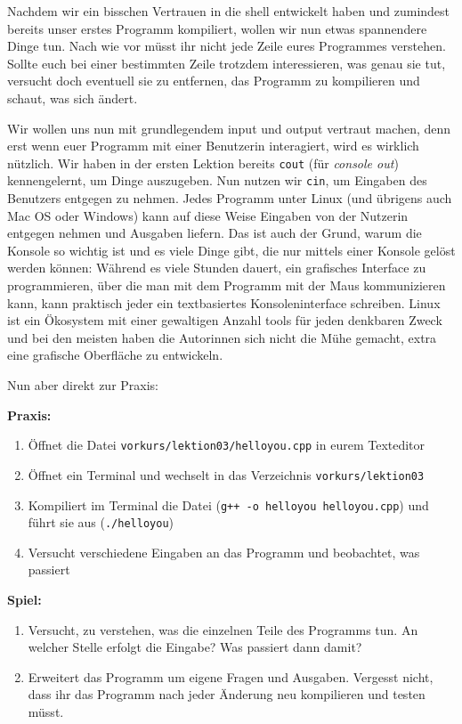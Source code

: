 
Nachdem wir ein bisschen Vertrauen in die shell entwickelt haben und zumindest
bereits unser erstes Programm kompiliert, wollen wir nun etwas spannendere
Dinge tun. Nach wie vor müsst ihr nicht jede Zeile eures Programmes verstehen.
Sollte euch bei einer bestimmten Zeile trotzdem interessieren, was genau sie
tut, versucht doch eventuell sie zu entfernen, das Programm zu kompilieren und
schaut, was sich ändert.

Wir wollen uns nun mit grundlegendem input und output vertraut machen, denn
erst wenn euer Programm mit einer Benutzerin interagiert, wird es wirklich
nützlich. Wir haben in der ersten Lektion bereits \texttt{cout} (für
\emph{console out}) kennengelernt, um Dinge auszugeben. Nun nutzen wir
\texttt{cin}, um Eingaben des Benutzers entgegen zu nehmen. Jedes Programm
unter Linux (und übrigens auch Mac OS oder Windows) kann auf diese Weise
Eingaben von der Nutzerin entgegen nehmen und Ausgaben liefern. Das ist auch
der Grund, warum die Konsole so wichtig ist und es viele Dinge gibt, die nur
mittels einer Konsole gelöst werden können: Während es viele Stunden dauert,
ein grafisches Interface zu programmieren, über die man mit dem Programm mit
der Maus kommunizieren kann, kann praktisch jeder ein textbasiertes
Konsoleninterface schreiben. Linux ist ein Ökosystem mit einer gewaltigen
Anzahl tools für jeden denkbaren Zweck und bei den meisten haben die Autorinnen
sich nicht die Mühe gemacht, extra eine grafische Oberfläche zu entwickeln.

Nun aber direkt zur Praxis:

\textbf{Praxis:}
\begin{enumerate}
    \item Öffnet die Datei \texttt{vorkurs/lektion03/helloyou.cpp} in eurem Texteditor
    \item Öffnet ein Terminal und wechselt in das Verzeichnis \texttt{vorkurs/lektion03}
    \item Kompiliert im Terminal die Datei (\texttt{g++ -o helloyou
        helloyou.cpp}) und führt sie aus (\texttt{./helloyou})
    \item Versucht verschiedene Eingaben an das Programm und beobachtet, was passiert
\end{enumerate}


\textbf{Spiel:}

\begin{enumerate}
    \item Versucht, zu verstehen, was die einzelnen Teile des Programms tun. An
        welcher Stelle erfolgt die Eingabe? Was passiert dann damit?
    \item Erweitert das Programm um eigene Fragen und Ausgaben. Vergesst nicht,
        dass ihr das Programm nach jeder Änderung neu kompilieren und testen
        müsst.
\end{enumerate}
